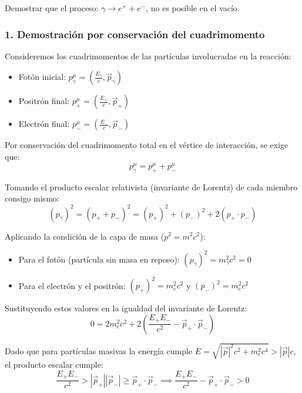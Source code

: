 \newpage
\begin{problema}
Demostrar que el proceso: $\gamma \rightarrow e^+ + e^-$, no es posible en el vacío.

\tcblower

\subsubsection*{1. Demostración por conservación del cuadrimomento}

Consideremos los cuadrimomentos de las partículas involucradas en la reacción:
\begin{itemize}
    \item Fotón inicial: $p_\gamma^\mu = \left(\frac{E_\gamma}{c}, \vec{p}_\gamma\right)$
    \item Positrón final: $p_+^\mu = \left(\frac{E_+}{c}, \vec{p}_+\right)$
    \item Electrón final: $p_-^\mu = \left(\frac{E_-}{c}, \vec{p}_-\right)$
\end{itemize}

Por conservación del cuadrimomento total en el vértice de interacción, se exige que:
\[
p_\gamma^\mu = p_+^\mu + p_-^\mu
\]

Tomando el producto escalar relativista (invariante de Lorentz) de cada miembro consigo mismo:
\[
(p_\gamma)^2 = (p_+ + p_-)^2 = (p_+)^2 + (p_-)^2 + 2 (p_+ \cdot p_-)
\]

Aplicando la condición de la capa de masa ($p^2 = m^2 c^2$):
\begin{itemize}
    \item Para el fotón (partícula sin masa en reposo): $(p_\gamma)^2 = m_\gamma^2 c^2 = 0$
    \item Para el electrón y el positrón: $(p_+)^2 = m_e^2 c^2$ y $(p_-)^2 = m_e^2 c^2$
\end{itemize}

Sustituyendo estos valores en la igualdad del invariante de Lorentz:
\[
0 = 2 m_e^2 c^2 + 2 \left( \frac{E_+ E_-}{c^2} - \vec{p}_+ \cdot \vec{p}_- \right)
\]

Dado que para partículas masivas la energía cumple $E = \sqrt{|\vec{p}|^2 c^2 + m_e^2 c^4} > |\vec{p}| c$, el producto escalar cumple:
\[
\frac{E_+ E_-}{c^2} > |\vec{p}_+| |\vec{p}_-| \ge \vec{p}_+ \cdot \vec{p}_- \implies \frac{E_+ E_-}{c^2} - \vec{p}_+ \cdot \vec{p}_- > 0
\]


\end{problema}

